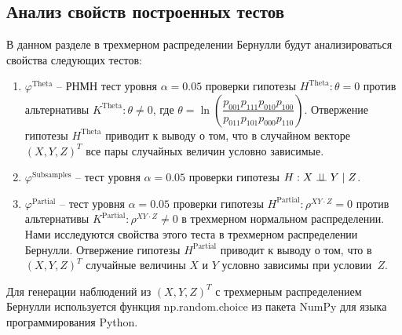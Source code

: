 \newpage
\subsection{Анализ свойств построенных тестов}\label{numerical_exp}

В данном разделе в трехмерном
распределении Бернулли
будут анализироваться свойства
следующих тестов:
\begin{enumerate}
    \item $\varphi^{\text{Theta}}$ -- РНМН тест уровня 
    $\alpha=0.05$ проверки гипотезы 
    $H^{\text{Theta}}: \theta=0$
    против альтернативы $K^{\text{Theta}}: \theta\neq 0$, где
     $\theta = \ln  \left(\dfrac{p_{001}p_{111}p_{010}p_{100}}{p_{011}p_{101}p_{000}p_{110}}\right)$.
     Отвержение гипотезы $H^{\text{Theta}}$ приводит к выводу
     о том, 
     что в случайном векторе $(X,Y,Z)^T$ все пары случайных величин условно зависимые.
    \item $\varphi^{\text{Subsamples}}$ -- тест уровня $\alpha=0.05$
    проверки гипотезы $H: X \perp\!\!\!\perp Y \mid Z$.
    \item $\varphi^{\text{Partial}}$ -- тест уровня $\alpha=0.05$
    проверки гипотезы $H^{\text{Partial}}: \rho^{XY\cdot Z}=0$
    против альтернативы $K^{\text{Partial}}: \rho^{XY\cdot Z}\neq 0$
    в трехмерном нормальном распределении.
    Нами исследуются свойства этого теста в трехмерном
    распределении Бернулли. Отвержение гипотезы 
    $H^{\text{Partial}}$ приводит к выводу о том, что 
    в  $(X,Y,Z)^T$ случайные величины
    $X$ и $Y$ условно зависимы при условии~$Z$.

\end{enumerate}

Для генерации наблюдений из $(X,Y,Z)^T$ 
с трехмерным распределением Бернулли
используется 
функция np.random.choice из пакета NumPy
для языка программирования Python. 

